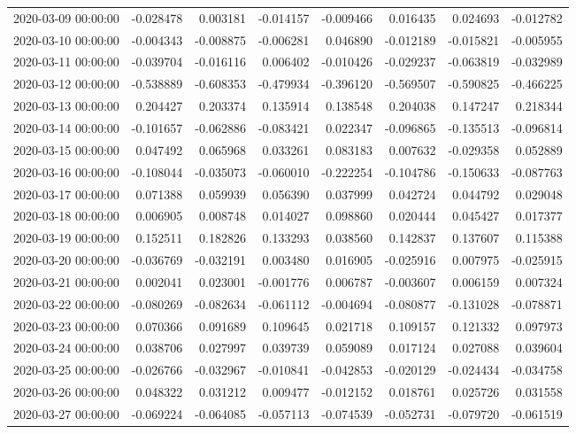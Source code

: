 \begin{tabular}{lrrrrrrr}
2020-03-09 00:00:00 & -0.028478 & 0.003181 & -0.014157 & -0.009466 & 0.016435 & 0.024693 & -0.012782 \\
2020-03-10 00:00:00 & -0.004343 & -0.008875 & -0.006281 & 0.046890 & -0.012189 & -0.015821 & -0.005955 \\
2020-03-11 00:00:00 & -0.039704 & -0.016116 & 0.006402 & -0.010426 & -0.029237 & -0.063819 & -0.032989 \\
2020-03-12 00:00:00 & -0.538889 & -0.608353 & -0.479934 & -0.396120 & -0.569507 & -0.590825 & -0.466225 \\
2020-03-13 00:00:00 & 0.204427 & 0.203374 & 0.135914 & 0.138548 & 0.204038 & 0.147247 & 0.218344 \\
2020-03-14 00:00:00 & -0.101657 & -0.062886 & -0.083421 & 0.022347 & -0.096865 & -0.135513 & -0.096814 \\
2020-03-15 00:00:00 & 0.047492 & 0.065968 & 0.033261 & 0.083183 & 0.007632 & -0.029358 & 0.052889 \\
2020-03-16 00:00:00 & -0.108044 & -0.035073 & -0.060010 & -0.222254 & -0.104786 & -0.150633 & -0.087763 \\
2020-03-17 00:00:00 & 0.071388 & 0.059939 & 0.056390 & 0.037999 & 0.042724 & 0.044792 & 0.029048 \\
2020-03-18 00:00:00 & 0.006905 & 0.008748 & 0.014027 & 0.098860 & 0.020444 & 0.045427 & 0.017377 \\
2020-03-19 00:00:00 & 0.152511 & 0.182826 & 0.133293 & 0.038560 & 0.142837 & 0.137607 & 0.115388 \\
2020-03-20 00:00:00 & -0.036769 & -0.032191 & 0.003480 & 0.016905 & -0.025916 & 0.007975 & -0.025915 \\
2020-03-21 00:00:00 & 0.002041 & 0.023001 & -0.001776 & 0.006787 & -0.003607 & 0.006159 & 0.007324 \\
2020-03-22 00:00:00 & -0.080269 & -0.082634 & -0.061112 & -0.004694 & -0.080877 & -0.131028 & -0.078871 \\
2020-03-23 00:00:00 & 0.070366 & 0.091689 & 0.109645 & 0.021718 & 0.109157 & 0.121332 & 0.097973 \\
2020-03-24 00:00:00 & 0.038706 & 0.027997 & 0.039739 & 0.059089 & 0.017124 & 0.027088 & 0.039604 \\
2020-03-25 00:00:00 & -0.026766 & -0.032967 & -0.010841 & -0.042853 & -0.020129 & -0.024434 & -0.034758 \\
2020-03-26 00:00:00 & 0.048322 & 0.031212 & 0.009477 & -0.012152 & 0.018761 & 0.025726 & 0.031558 \\
2020-03-27 00:00:00 & -0.069224 & -0.064085 & -0.057113 & -0.074539 & -0.052731 & -0.079720 & -0.061519 \\

\end{tabular}
